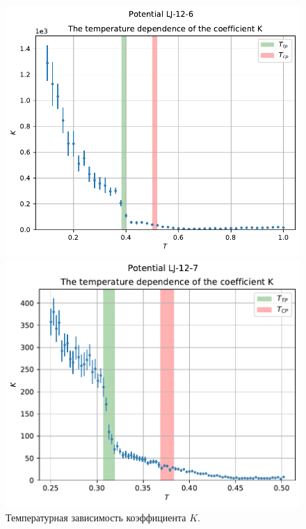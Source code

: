 \documentclass[pdf,hyperref={unicode}]{beamer}
\begin{document}
\begin{frame}
\begin{columns}
\begin{column}{0.6\linewidth}
\begin{figure}[h]
\begin{center}
\begin{minipage}[h]{0.45\linewidth}
\includegraphics[width=\textwidth, keepaspectratio]{plot_K_Potential LJ-12-6_1}
\end{minipage}
\begin{minipage}[h]{0.45\linewidth}
\includegraphics[width=\textwidth, keepaspectratio]{plot_K_Potential LJ-12-7_1}
\end{minipage}
\caption{\tiny Температурная зависимость коэффициента $K$.}
\label{risK}
\end{center}
\end{figure}


\end{column}
\end{columns}
\end{frame}
\end{document}
